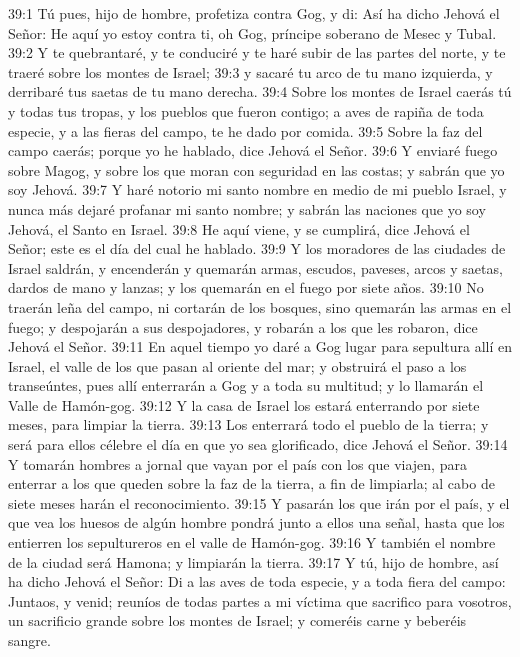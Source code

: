 39:1 Tú pues, hijo de hombre, profetiza contra Gog, y di: Así ha dicho Jehová el Señor: He aquí yo estoy contra ti, oh Gog, príncipe soberano de Mesec y Tubal.   
39:2 Y te quebrantaré, y te conduciré y te haré subir de las partes del norte, y te traeré sobre los montes de Israel;   
39:3 y sacaré tu arco de tu mano izquierda, y derribaré tus saetas de tu mano derecha.   
39:4 Sobre los montes de Israel caerás tú y todas tus tropas, y los pueblos que fueron contigo; a aves de rapiña de toda especie, y a las fieras del campo, te he dado por comida.   
39:5 Sobre la faz del campo caerás; porque yo he hablado, dice Jehová el Señor.   
39:6 Y enviaré fuego sobre Magog, y sobre los que moran con seguridad en las costas; y sabrán que yo soy Jehová.   
39:7 Y haré notorio mi santo nombre en medio de mi pueblo Israel, y nunca más dejaré profanar mi santo nombre; y sabrán las naciones que yo soy Jehová, el Santo en Israel.   
39:8 He aquí viene, y se cumplirá, dice Jehová el Señor; este es el día del cual he hablado.   
39:9 Y los moradores de las ciudades de Israel saldrán, y encenderán y quemarán armas, escudos, paveses, arcos y saetas, dardos de mano y lanzas; y los quemarán en el fuego por siete años.   
39:10 No traerán leña del campo, ni cortarán de los bosques, sino quemarán las armas en el fuego; y despojarán a sus despojadores, y robarán a los que les robaron, dice Jehová el Señor.   
39:11 En aquel tiempo yo daré a Gog lugar para sepultura allí en Israel, el valle de los que pasan al oriente del mar; y obstruirá el paso a los transeúntes, pues allí enterrarán a Gog y a toda su multitud; y lo llamarán el Valle de Hamón-gog.   
39:12 Y la casa de Israel los estará enterrando por siete meses, para limpiar la tierra.   
39:13 Los enterrará todo el pueblo de la tierra; y será para ellos célebre el día en que yo sea glorificado, dice Jehová el Señor.   
39:14 Y tomarán hombres a jornal que vayan por el país con los que viajen, para enterrar a los que queden sobre la faz de la tierra, a fin de limpiarla; al cabo de siete meses harán el reconocimiento.   
39:15 Y pasarán los que irán por el país, y el que vea los huesos de algún hombre pondrá junto a ellos una señal, hasta que los entierren los sepultureros en el valle de Hamón-gog.   
39:16 Y también el nombre de la ciudad será Hamona; y limpiarán la tierra.   
39:17 Y tú, hijo de hombre, así ha dicho Jehová el Señor: Di a las aves de toda especie, y a toda fiera del campo: Juntaos, y venid; reuníos de todas partes a mi víctima que sacrifico para vosotros, un sacrificio grande sobre los montes de Israel; y comeréis carne y beberéis sangre.   
